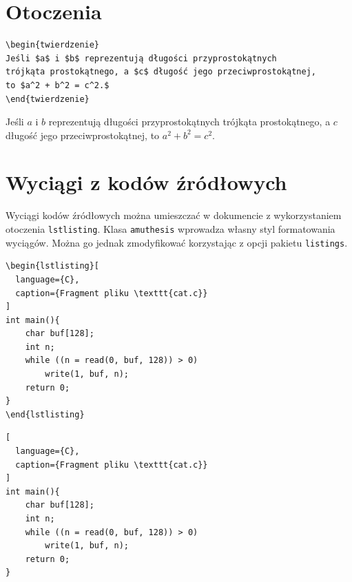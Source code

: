 \documentclass[oneside]{amuthesis}
\begin{document}
\section{Otoczenia}

\begin{verbatim}
\begin{twierdzenie}
Jeśli $a$ i $b$ reprezentują długości przyprostokątnych
trójkąta prostokątnego, a $c$ długość jego przeciwprostokątnej,
to $a^2 + b^2 = c^2.$
\end{twierdzenie}
\end{verbatim}

\begin{twierdzenie}
Jeśli $a$ i $b$ reprezentują długości przyprostokątnych
trójkąta prostokątnego, a $c$ długość jego przeciwprostokątnej,
to $a^2 + b^2 = c^2.$
\end{twierdzenie}

\section{Wyciągi z kodów źródłowych}

Wyciągi kodów źródłowych można umieszczać w dokumencie z wykorzystaniem otoczenia \texttt{lstlisting}. Klasa \texttt{amuthesis} wprowadza własny styl formatowania wyciągów. Można go jednak zmodyfikować korzystając z opcji pakietu \texttt{listings}.

\begin{verbatim}
\begin{lstlisting}[
  language={C},
  caption={Fragment pliku \texttt{cat.c}}
]
int main(){
    char buf[128];
    int n;
    while ((n = read(0, buf, 128)) > 0)
        write(1, buf, n);
    return 0;
}
\end{lstlisting}
\end{verbatim}

\begin{lstlisting}[
  language={C},
  caption={Fragment pliku \texttt{cat.c}}
]
int main(){
    char buf[128];
    int n;
    while ((n = read(0, buf, 128)) > 0)
        write(1, buf, n);
    return 0;
}
\end{lstlisting}
\end{document}
